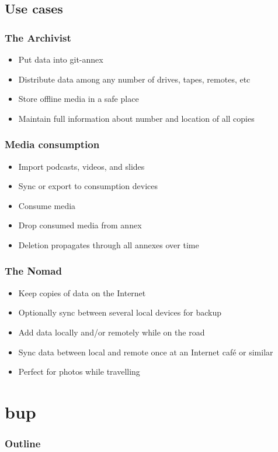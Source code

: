 \documentclass[t]{beamer}
\begin{document}
\subsection{Use cases}

\begin{frame}
	\frametitle{The Archivist}
	\begin{itemize}
		\item Put data into git-annex
		\item Distribute data among any number of drives, tapes, remotes, etc
		\item Store offline media in a safe place
		\item Maintain full information about number and location of all copies
	\end{itemize}
\end{frame}

\begin{frame}
	\frametitle{Media consumption}
	\begin{itemize}
		\item Import podcasts, videos, and slides
		\item Sync or export to consumption devices
		\item Consume media
		\item Drop consumed media from annex
		\item Deletion propagates through all annexes over time
	\end{itemize}
\end{frame}

\begin{frame}
	\frametitle{The Nomad}
	\begin{itemize}
		\item Keep copies of data on the Internet
		\item Optionally sync between several local devices for backup
		\item Add data locally and/or remotely while on the road
		\item Sync data between local and remote once at an Internet café or similar
		\item Perfect for photos while travelling
	\end{itemize}
\end{frame}


\section{bup}

\begin{frame}
	\frametitle{Outline}
	\tableofcontents[currentsection]
\end{frame}
\end{document}
